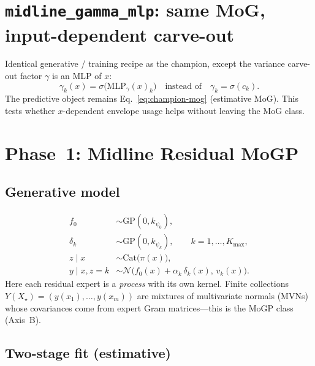 \documentclass[11pt,a4paper]{article}
\newcommand{\Ncal}{\mathcal{N}}
\newcommand{\Kmax}{K_{\max}}
\newcommand{\sigmoid}{\sigma}
\theoremstyle{definition}
\begin{document}
\section{\texttt{midline\_gamma\_mlp}: same MoG, input-dependent carve-out}
\label{sec:gamma-mlp}

Identical generative / training recipe as the champion, except the variance
carve-out factor $\gamma$ is an MLP of $x$:
\[
  \gamma_k(x)=\sigmoid\!\bigl(\mathrm{MLP}_\gamma(x)_k\bigr)
  \quad\text{instead of}\quad
  \gamma_k=\sigmoid(c_k).
\]
The predictive object remains Eq.~\eqref{eq:champion-mog} (estimative MoG).
This tests whether $x$-dependent envelope usage helps without leaving the MoG
class.

\section{Phase~1: Midline Residual MoGP}
\label{sec:residual}

\subsection{Generative model}

\begin{equation}
\label{eq:residual-gen}
\begin{aligned}
  f_0 &\sim \mathrm{GP}(0,k_{\psi_0}),\\
  \delta_k &\sim \mathrm{GP}(0,k_{\psi_k}),
  \qquad k=1,\ldots,\Kmax,\\
  z\mid x &\sim \mathrm{Cat}\bigl(\pi(x)\bigr),\\
  y\mid x,z{=}k &\sim
  \Ncal\!\bigl(
    f_0(x)+\alpha_k\,\delta_k(x),\,
    v_k(x)
  \bigr).
\end{aligned}
\end{equation}
Here each residual expert is a \emph{process} with its own kernel. Finite
collections $Y(X_\star)=(y(x_1),\ldots,y(x_m))$ are mixtures of multivariate
normals (MVNs) whose covariances come from expert Gram matrices---this is the
MoGP class (Axis~B).

\subsection{Two-stage fit (estimative)}
\end{document}
